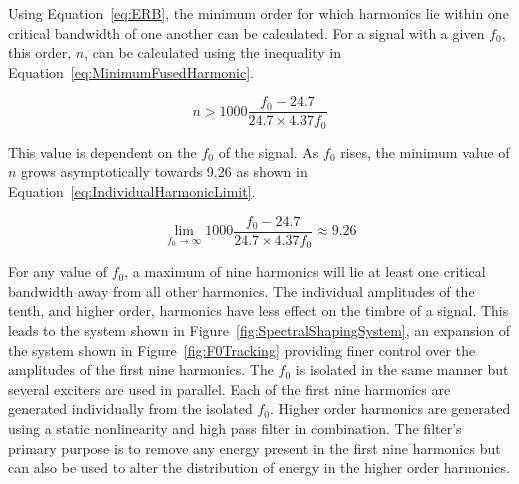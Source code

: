 		Using Equation~\ref{eq:ERB}, the minimum order for which harmonics lie within one critical bandwidth of one
		another can be calculated. For a signal with a given $f_{0}$, this order, $n$, can be calculated using the
		inequality in Equation~\ref{eq:MinimumFusedHarmonic}.


		\begin{equation}
			n > 1000 \frac{f_{0} - 24.7}{24.7 \times 4.37f_{0}}
			\label{eq:MinimumFusedHarmonic}
		\end{equation}

		This value is dependent on the $f_{0}$ of the signal. As $f_{0}$ rises, the minimum value of $n$ grows
		asymptotically towards 9.26 as shown in Equation~\ref{eq:IndividualHarmonicLimit}.

		\begin{equation}
			\lim_{f_{0} \to \infty} 1000 \frac{f_{0} - 24.7}{24.7 \times 4.37f_{0}} \approx 9.26
			\label{eq:IndividualHarmonicLimit}
		\end{equation}

		For any value of $f_{0}$, a maximum of nine harmonics will lie at least one critical bandwidth away from
		all other harmonics. The individual amplitudes of the tenth, and higher order, harmonics have less effect
		on the timbre of a signal. This leads to the system shown in Figure~\ref{fig:SpectralShapingSystem}, an
		expansion of the system shown in Figure~\ref{fig:F0Tracking} providing finer control over the amplitudes of
		the first nine harmonics. The $f_{0}$ is isolated in the same manner but several exciters are used in
		parallel. Each of the first nine harmonics are generated individually from the isolated $f_{0}$. Higher
		order harmonics are generated using a static nonlinearity and high pass filter in combination. The filter's
		primary purpose is to remove any energy present in the first nine harmonics but can also be used to alter
		the distribution of energy in the higher order harmonics.

